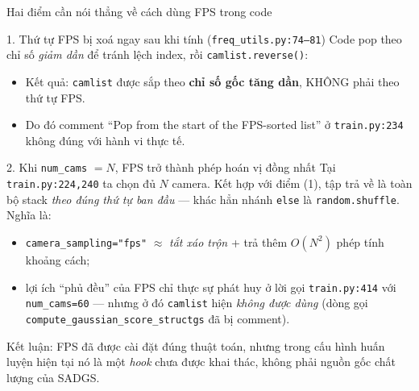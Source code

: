 \begin{frame}{Hai điểm cần nói thẳng về cách dùng FPS trong code}
\footnotesize
\begin{block}{\footnotesize 1. Thứ tự FPS bị xoá ngay sau khi tính (\texttt{freq\_utils.py:74--81})}
\scriptsize
Code pop theo chỉ số \emph{giảm dần} để tránh lệch index, rồi \texttt{camlist.reverse()}:
\begin{itemize}
  \item Kết quả: \texttt{camlist} được sắp theo \textbf{chỉ số gốc tăng dần}, KHÔNG phải theo thứ tự FPS.
  \item Do đó comment ``Pop from the start of the FPS-sorted list'' ở \texttt{train.py:234} không đúng với hành vi thực tế.
\end{itemize}
\end{block}
\begin{block}{\footnotesize 2. Khi \texttt{num\_cams} $=N$, FPS trở thành phép hoán vị đồng nhất}
\scriptsize
Tại \texttt{train.py:224,240} ta chọn đủ $N$ camera. Kết hợp với điểm (1), tập trả về là toàn bộ stack \emph{theo đúng thứ tự ban đầu} --- khác hẳn nhánh \texttt{else} là \texttt{random.shuffle}. Nghĩa là:
\begin{itemize}
  \item \texttt{camera\_sampling="fps"} $\approx$ \emph{tắt xáo trộn} + trả thêm $O(N^2)$ phép tính khoảng cách;
  \item lợi ích ``phủ đều'' của FPS chỉ thực sự phát huy ở lời gọi \texttt{train.py:414} với \texttt{num\_cams=60} --- nhưng ở đó \texttt{camlist} hiện \emph{không được dùng} (dòng gọi \texttt{compute\_gaussian\_score\_structgs} đã bị comment).
\end{itemize}
\end{block}
\scriptsize Kết luận: FPS đã được cài đặt đúng thuật toán, nhưng trong cấu hình huấn luyện hiện tại nó là một \emph{hook} chưa được khai thác, không phải nguồn gốc chất lượng của SADGS.
\end{frame}


